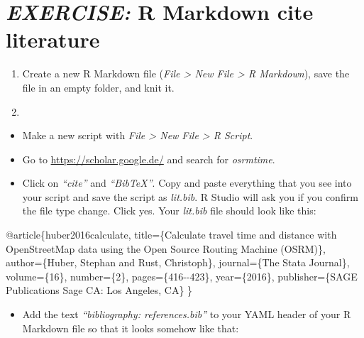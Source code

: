\documentclass[
  12pt,
  oneside]{book}
\newenvironment{Shaded}{\begin{snugshade}}{\end{snugshade}}
\newcommand{\NormalTok}[1]{#1}
\providecommand{\tightlist}{%
  \setlength{\itemsep}{0pt}\setlength{\parskip}{0pt}}
\begin{document}
\hypertarget{exercise-r-markdown-cite-literature}{%
\section*{\texorpdfstring{\emph{EXERCISE:} R Markdown cite literature}{EXERCISE: R Markdown cite literature}}\label{exercise-r-markdown-cite-literature}}

\begin{enumerate}
\def\labelenumi{\alph{enumi})}
\tightlist
\item
  Create a new R Markdown file (\emph{File \textgreater{} New File \textgreater{} R Markdown}), save the file in an empty folder, and knit it.
\item
\end{enumerate}

\begin{itemize}
\tightlist
\item
  Make a new script with \emph{File \textgreater{} New File \textgreater{} R Script}.
\item
  Go to \url{https://scholar.google.de/} and search for \emph{osrmtime}.
\item
  Click on \emph{``cite''} and \emph{``BibTeX''}. Copy and paste everything that you see into your script and save the script as \emph{lit.bib}. R Studio will ask you if you confirm the file type change. Click yes. Your \emph{lit.bib} file should look like this:
\end{itemize}

\begin{Shaded}
\begin{Highlighting}[]
\NormalTok{@article\{huber2016calculate,}
\NormalTok{  title=\{Calculate travel time and distance with OpenStreetMap data using the Open Source Routing Machine (OSRM)\},}
\NormalTok{  author=\{Huber, Stephan and Rust, Christoph\},}
\NormalTok{  journal=\{The Stata Journal\},}
\NormalTok{  volume=\{16\},}
\NormalTok{  number=\{2\},}
\NormalTok{  pages=\{416{-}{-}423\},}
\NormalTok{  year=\{2016\},}
\NormalTok{  publisher=\{SAGE Publications Sage CA: Los Angeles, CA\}}
\NormalTok{\}}
\end{Highlighting}
\end{Shaded}

\begin{itemize}
\tightlist
\item
  Add the text \emph{``bibliography: references.bib''} to your YAML header of your R Markdown file so that it looks somehow like that:
\end{itemize}
\end{document}
